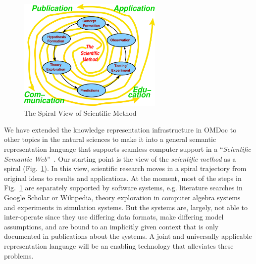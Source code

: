 \begin{figure}[ht]
\begin{center}
  \includegraphics[width=7cm]{sci-method}
\end{center}
\caption{The Spiral View of Scientific Method}\label{fig:nw-Methode}
\end{figure}

We have extended the knowledge representation infrastructure in OMDoc to other topics in
the natural sciences to make it into a general semantic representation language that
supports seamless computer support in a ``{\emph{Scientific Semantic
    Web}}''~\cite{HilKohSta:copmem06}. Our starting point is the view of the
{\emph{scientific method}} as a spiral (Fig.~\ref{fig:nw-Methode}). In this view,
scientific research moves in a spiral trajectory from original ideas to results and
applications. At the moment, most of the steps in Fig.~\ref{fig:nw-Methode} are separately
supported by software systems, e.g. literature searches in Google Scholar or Wikipedia,
theory exploration in computer algebra systems and experiments in simulation systems. But
the systems are, largely, not able to inter-operate since they use differing data formats,
make differing model assumptions, and are bound to an implicitly given context that is
only documented in publications about the systems. A joint and universally applicable
representation language will be an enabling technology that alleviates these problems.

